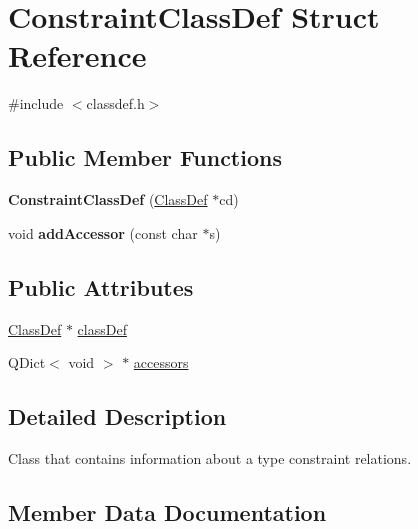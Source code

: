 \hypertarget{struct_constraint_class_def}{}\section{Constraint\+Class\+Def Struct Reference}
\label{struct_constraint_class_def}


{\ttfamily \#include $<$classdef.\+h$>$}

\subsection*{Public Member Functions}
\begin{DoxyCompactItemize}
\item 
\mbox{\label{struct_constraint_class_def_a511b92d880437fdff407845cc372ca1d}} 
{\bfseries Constraint\+Class\+Def} (\mbox{\hyperlink{class_class_def}{Class\+Def}} $\ast$cd)
\item 
\mbox{\label{struct_constraint_class_def_aefe7422f7e2f4386076764d7ea5e3800}} 
void {\bfseries add\+Accessor} (const char $\ast$s)
\end{DoxyCompactItemize}
\subsection*{Public Attributes}
\begin{DoxyCompactItemize}
\item 
\mbox{\hyperlink{class_class_def}{Class\+Def}} $\ast$ \mbox{\hyperlink{struct_constraint_class_def_a19b68e8a482c234e891caf07a74608ef}{class\+Def}}
\item 
Q\+Dict$<$ void $>$ $\ast$ \mbox{\hyperlink{struct_constraint_class_def_ac683f0a91d18455baad63d1582aa6e5b}{accessors}}
\end{DoxyCompactItemize}


\subsection{Detailed Description}
Class that contains information about a type constraint relations. 

\subsection{Member Data Documentation}
\mbox{\label{struct_constraint_class_def_ac683f0a91d18455baad63d1582aa6e5b}} 
